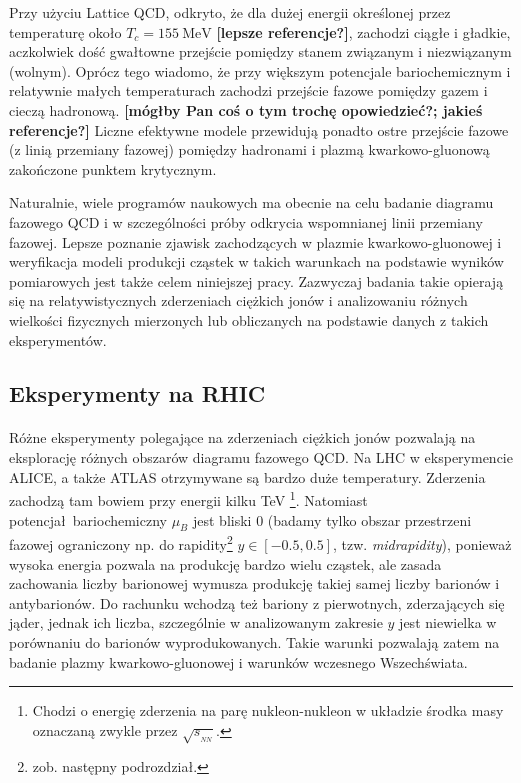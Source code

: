 \documentclass[a4paper,12pt]{article}
\begin{document}
Przy użyciu Lattice QCD, odkryto, że dla dużej energii określonej przez temperaturę około $T_c = 155~\text{MeV}$ \cite{Andronic:2017pug} {\textbf{\color{blue}[lepsze referencje?]}}, zachodzi ciągłe i gładkie, aczkolwiek dość gwałtowne przejście pomiędzy stanem związanym i niezwiązanym (wolnym). Oprócz tego wiadomo, że przy większym potencjale bariochemicznym i relatywnie małych temperaturach zachodzi przejście fazowe pomiędzy gazem i cieczą hadronową. {\textbf{\color{blue} [mógłby Pan coś o tym trochę opowiedzieć?; jakieś referencje?]}} Liczne efektywne modele przewidują ponadto ostre przejście fazowe (z linią przemiany fazowej) pomiędzy hadronami i plazmą kwarkowo-gluonową zakończone punktem krytycznym. 

Naturalnie, wiele programów naukowych ma obecnie na celu badanie diagramu fazowego QCD i w szczególności próby odkrycia wspomnianej linii przemiany fazowej. Lepsze poznanie zjawisk zachodzących w plazmie kwarkowo-gluonowej i weryfikacja modeli produkcji cząstek w takich warunkach na podstawie wyników pomiarowych jest także celem niniejszej pracy. Zazwyczaj badania takie opierają się na relatywistycznych zderzeniach ciężkich jonów i analizowaniu różnych wielkości fizycznych mierzonych lub obliczanych na podstawie danych z takich eksperymentów.

\subsection{Eksperymenty na RHIC}
\paragraph{}
Różne eksperymenty polegające na zderzeniach ciężkich jonów pozwalają na eksplorację różnych obszarów diagramu fazowego QCD. Na LHC w eksperymencie ALICE, a także ATLAS otrzymywane są bardzo duże temperatury. Zderzenia zachodzą tam bowiem przy energii kilku TeV \footnote{Chodzi o energię zderzenia na parę nukleon-nukleon w układzie środka masy oznaczaną zwykle przez  $\sqrt{s_{_{NN}}}$.}. Natomiast potencjał bariochemiczny $\mu_B$ jest bliski 0 (badamy tylko obszar przestrzeni fazowej ograniczony np. do rapidity\footnote{zob. następny podrozdział.} $y \in [-0.5, 0.5]$, tzw. \textit{midrapidity}), ponieważ wysoka energia pozwala na produkcję bardzo wielu cząstek, ale zasada zachowania liczby barionowej wymusza produkcję takiej samej liczby barionów i antybarionów. Do rachunku wchodzą też bariony z pierwotnych, zderzających się jąder, jednak ich liczba, szczególnie w analizowanym zakresie $y$ jest niewielka w porównaniu do barionów wyprodukowanych. Takie warunki pozwalają zatem na badanie plazmy kwarkowo-gluonowej i warunków wczesnego Wszechświata.
\end{document}
